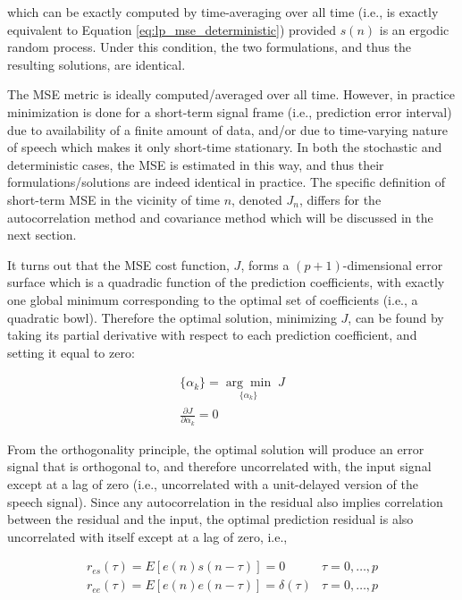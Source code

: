 \noindent
which can be exactly computed by time-averaging over all time (i.e., is exactly equivalent to Equation \ref{eq:lp_mse_deterministic}) provided $s(n)$ is an ergodic random process. Under this condition, the two formulations, and thus the resulting solutions, are identical.

The MSE metric is ideally computed/averaged over all time. However, in practice minimization is done for a short-term signal frame (i.e., prediction error interval) due to availability of a finite amount of data, and/or due to time-varying nature of speech which makes it only short-time stationary. In both the stochastic and deterministic cases, the MSE is estimated in this way, and thus their formulations/solutions are indeed identical in practice. The specific definition of short-term MSE in the vicinity of time $n$, denoted $J_n$, differs for the autocorrelation method and covariance method which will be discussed in the next section.

It turns out that the MSE cost function, $J$, forms a $(p+1)$-dimensional error surface which is a quadradic function of the prediction coefficients, with exactly one global minimum corresponding to the optimal set of coefficients (i.e., a quadratic bowl). Therefore the optimal solution, minimizing $J$, can be found by taking its partial derivative with respect to each prediction coefficient, and setting it equal to zero:


\begin{eqnarray}
	\{\alpha_k\} = \underset{\{\alpha_k\}}{\arg\min} \; J \\
	\frac{\partial J}{\partial \alpha_k}=0
\end{eqnarray}

From the orthogonality principle, the optimal solution will produce an error signal that is orthogonal to, and therefore uncorrelated with, the input signal except at a lag of zero (i.e., uncorrelated with a unit-delayed version of the speech signal). Since any autocorrelation in the residual also implies correlation between the residual and the input, the optimal prediction residual is also uncorrelated with itself except at a lag of zero, i.e.,

\begin{eqnarray}
	r_{es}(\tau) = E\left[e(n)s(n-\tau)\right] = 0 & \tau=0,\dots,p \label{eq:optimal_r_es} \\
	r_{ee}(\tau) = E\left[e(n)e(n-\tau)\right]=\delta(\tau)  & \tau=0,\dots,p  \label{eq:optimal_r_ee}
\end{eqnarray}

